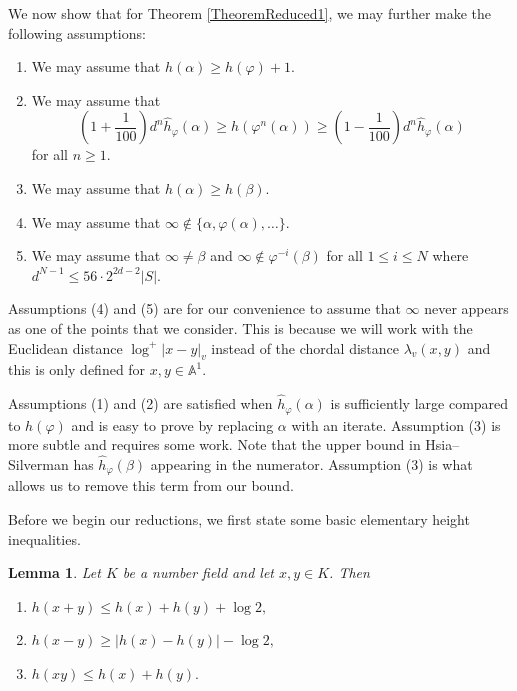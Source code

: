 \documentclass[10pt, reqno]{amsart}
\newcommand{\bb}{\mathbb}
\newcommand{\vphi}{\varphi}
\newcommand{\h}{\widehat{h}}
\numberwithin{theorem}{section}
\newtheorem{lemma}[theorem]{Lemma}
\numberwithin{equation}{section}
\numberwithin{example}{section}
\numberwithin{definition}{section}
\begin{document}
We now show that for Theorem \ref{TheoremReduced1}, we may further make the following assumptions:

\begin{enumerate}
\item We may assume that $h(\alpha) \geq h(\vphi)+1$.

\item We may assume that 
$$\left(1+ \frac{1}{100} \right) d^n \h_{\vphi}(\alpha) \geq h(\vphi^n(\alpha)) \geq \left(1 - \frac{1}{100} \right) d^n \h_{\vphi}(\alpha)$$
for all $n \geq 1$. 

\item We may assume that $h(\alpha) \geq h(\beta)$.

\item We may assume that $\infty \not \in \{\alpha,\vphi(\alpha),\ldots\}$. 

\item We may assume that $\infty \not = \beta$ and $\infty \not \in \vphi^{-i}(\beta)$ for all $1 \leq i \leq N$ where $d^{N-1} \leq 56 \cdot 2^{2d-2} |S|$.
\end{enumerate}

Assumptions (4) and (5) are for our convenience to assume that $\infty$ never appears as one of the points that we consider. This is because we will work with the Euclidean distance $\log^+|x-y|_v$ instead of the chordal distance $\lambda_v(x,y)$ and this is only defined for $x,y \in \bb{A}^1$. 
\par 
Assumptions (1) and (2) are satisfied when $\h_{\vphi}(\alpha)$ is sufficiently large compared to $h(\vphi)$ and is easy to prove by replacing $\alpha$ with an iterate. Assumption (3) is more subtle and requires some work. Note that the upper bound in Hsia--Silverman \cite[Equation (3)]{HS11} has $\h_{\vphi}(\beta)$ appearing in the numerator. Assumption (3) is what allows us to remove this term from our bound. 
\par 
Before we begin our reductions, we first state some basic elementary height inequalities. 

\begin{lemma} \label{Heights1}
Let $K$ be a number field and let $x,y \in K$. Then 

\begin{enumerate} 
\item $h(x+y) \leq h(x) + h(y) + \log 2,$
\item $h(x-y) \geq |h(x) - h(y)| - \log 2,$
\item $h(xy) \leq h(x) + h(y).$

\end{enumerate}
\end{lemma}
\end{document}
